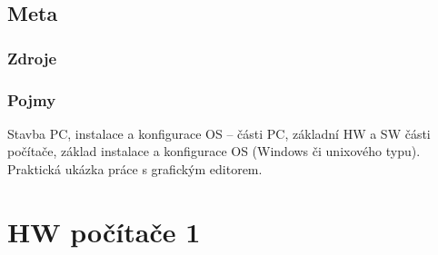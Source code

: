 \documentclass[12pt]{article}
\begin{document}
\subsection{Meta}
\subsubsection{Zdroje}
\subsubsection{Pojmy}
Stavba PC, instalace a konfigurace OS – části PC, základní HW a SW části počítače, základ instalace a konfigurace OS (Windows či unixového typu). Praktická ukázka práce s grafickým editorem.

\section{HW počítače 1}
\end{document}
